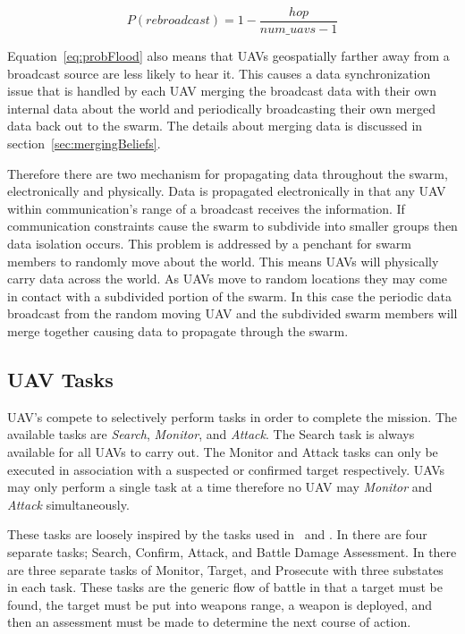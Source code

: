 \begin{equation}
\label{eq:probFlood}
P(rebroadcast) = 1 - \frac{hop}{num\_uavs - 1}
\end{equation}

Equation~\ref{eq:probFlood} also means that UAVs geospatially farther away from a broadcast source are less likely to hear it.  This causes a data synchronization issue that is handled by each UAV merging the broadcast data with their own internal data about the world and periodically broadcasting their own merged data back out to the swarm.  The details about merging data is discussed in section~\ref{sec:mergingBeliefs}.

Therefore there are two mechanism for propagating data throughout the swarm, electronically and physically.  Data is propagated electronically in that any UAV within communication's range of a broadcast receives the information.  If communication constraints cause the swarm to subdivide into smaller groups then data isolation occurs.  This problem is addressed by a penchant for swarm members to randomly move about the world.  This means UAVs will physically carry data across the world.  As UAVs move to random locations they may come in contact with a subdivided portion of the swarm.  In this case the periodic data broadcast from the random moving UAV and the subdivided swarm members will merge together causing data to propagate through the swarm.

\subsection{UAV Tasks}
UAV's compete to selectively perform tasks in order to complete the mission.  The available tasks are \textit{Search}, \textit{Monitor}, and \textit{Attack}.  The Search task is always available for all UAVs to carry out.  The Monitor and Attack tasks can only be executed in association with a suspected or confirmed target respectively.  UAVs may only perform a single task at a time therefore no UAV may \textit{Monitor} and \textit{Attack} simultaneously.

These tasks are loosely inspired by the tasks used in~\textcite{jin} and \textcite{wtaSurvey}.  In \textcite{jin} there are four separate tasks; Search, Confirm, Attack, and Battle Damage Assessment.  In \textcite{wtaSurvey} there are three separate tasks of Monitor, Target, and Prosecute with three substates in each task.  These tasks are the generic flow of battle in that a target must be found, the target must be put into weapons range, a weapon is deployed, and then an assessment must be made to determine the next course of action.

